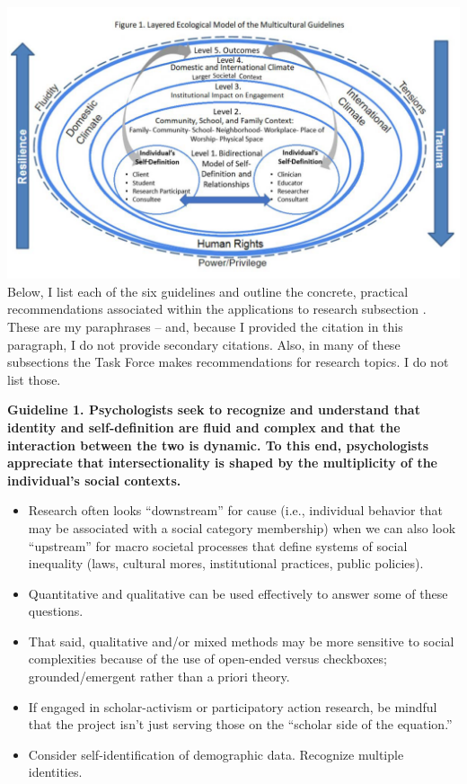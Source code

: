 \documentclass[
  english,
]{book}
\providecommand{\tightlist}{%
  \setlength{\itemsep}{0pt}\setlength{\parskip}{0pt}}
\begin{document}
\includegraphics{images/JEDI/Bronfenbrenner.png}
Below, I list each of the six guidelines and outline the concrete, practical recommendations associated within the applications to research subsection \citep{task_force_on_re-envisioning_the_multicultural_guidelines_for_the_21st_century_multicultural_2017}. These are my paraphrases -- and, because I provided the citation in this paragraph, I do not provide secondary citations. Also, in many of these subsections the Task Force makes recommendations for research topics. I do not list those.

\textbf{Guideline 1. Psychologists seek to recognize and understand that identity and self-definition are fluid and complex and that the interaction between the two is dynamic. To this end, psychologists appreciate that intersectionality is shaped by the multiplicity of the individual's social contexts.}

\begin{itemize}
\tightlist
\item
  Research often looks ``downstream'' for cause (i.e., individual behavior that may be associated with a social category membership) when we can also look ``upstream'' for macro societal processes that define systems of social inequality (laws, cultural mores, institutional practices, public policies).
\item
  Quantitative and qualitative can be used effectively to answer some of these questions.
\item
  That said, qualitative and/or mixed methods may be more sensitive to social complexities because of the use of open-ended versus checkboxes; grounded/emergent rather than a priori theory.
\item
  If engaged in scholar-activism or participatory action research, be mindful that the project isn't just serving those on the ``scholar side of the equation.''
\item
  Consider self-identification of demographic data. Recognize multiple identities.
\end{itemize}
\end{document}

